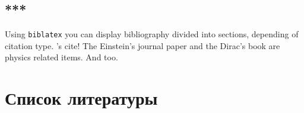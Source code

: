 \documentclass[
subf, %
times %
]{article}
\begin{document}
	
%

\tableofcontents

%
%
%

\begin{center}
\section{***} 	
\end{center}
	

Using \texttt{biblatex} you can display bibliography divided into sections, 
depending of citation type. 's cite! The Einstein's journal paper \cite{einstein} and the Dirac's 
book \cite{dirac} are physics related items.  And \cite{knuthwebsite} too.


\medskip
\section*{Список литературы}
\renewcommand{\refname}{}	%
\printbibliography

%
	
\end{document}
